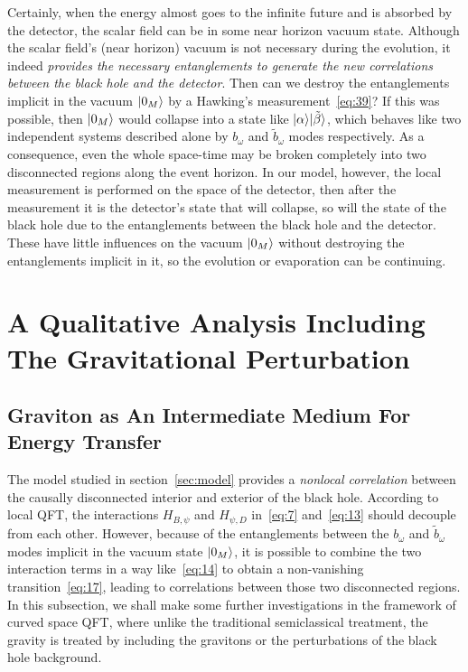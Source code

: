 \documentclass[12pt,a4paper]{article}
\begin{document}
Certainly, when the energy almost goes to the infinite future and is absorbed by
the detector, the scalar field can be in some near horizon vacuum state. Although the scalar field's (near horizon) vacuum is not
necessary during the evolution, it indeed
\emph{provides the necessary entanglements to generate the new correlations
between the black hole and the detector}. Then can we destroy the entanglements implicit in the vacuum $\arrowvert0_M\rangle$ by a Hawking's
measurement~\eqref{eq:39}? If this was possible, then
$\arrowvert0_M\rangle$ would collapse into a state like $\arrowvert\alpha\rangle\arrowvert\tilde{\beta}\rangle$, which behaves like two
independent systems described alone by $b_{\omega}$
and $\tilde{b}_{\omega}$ modes respectively. As a consequence, even the whole
space-time may be broken completely into two disconnected regions along the
event horizon. In our model, however, the local measurement is performed on the space of the detector,
then after the measurement it is the detector's state that will
collapse, so will the state of the black hole due to the entanglements between the black hole and the detector. These have little influences on the vacuum
$\arrowvert0_M\rangle$ without destroying the entanglements implicit in it, so the evolution or evaporation can be continuing.


\section{A Qualitative Analysis Including The Gravitational Perturbation }
\label{sec:nonlocal}


\subsection{Graviton as An Intermediate Medium For Energy Transfer}
\label{sec:gra}

The model studied in section~\ref{sec:model} provides a \emph{nonlocal correlation} between the causally disconnected interior and exterior of the black
hole. According to local QFT, the interactions $H_{B,\psi}$ and $H_{\psi,D}$ in~\eqref{eq:7} and~\eqref{eq:13} should decouple from each other. However, because of the entanglements between the $b_{\omega}$ and $\tilde{b}_{\omega}$ modes implicit in the vacuum state $\arrowvert0_M\rangle$, it is possible to combine the two interaction terms in a way like~\eqref{eq:14} to obtain a non-vanishing transition~\eqref{eq:17}, leading to correlations between those two disconnected regions. In this subsection, we shall make some further investigations in the framework of curved space QFT, where unlike the traditional semiclassical treatment, the gravity is treated by including
the gravitons or the perturbations of the black hole background.
\end{document}
